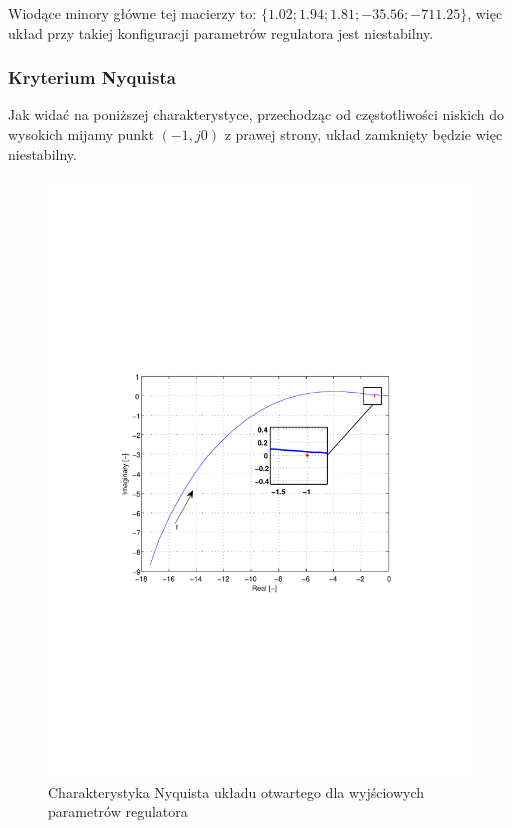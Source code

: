 \documentclass[12pt]{article}
\begin{document}
Wiodące minory główne tej macierzy to: $\{1.02;1.94;1.81;-35.56;-711.25\}$, więc
układ przy takiej konfiguracji parametrów regulatora jest niestabilny.

\newpage

\subsubsection{Kryterium Nyquista}

Jak widać na poniższej charakterystyce, przechodząc od częstotliwości niskich do
wysokich mijamy punkt $(-1, j0)$ z prawej strony, układ zamknięty będzie więc
niestabilny.

\begin{figure}[!htb]
	\begin{center}
		\includegraphics[trim=5cm 9cm 5cm 9cm]{../res/img/2-1-0,5_nyq.pdf} 
	\end{center}
	\caption{Charakterystyka Nyquista układu otwartego dla wyjściowych parametrów
	regulatora}
\end{figure}
\end{document}
